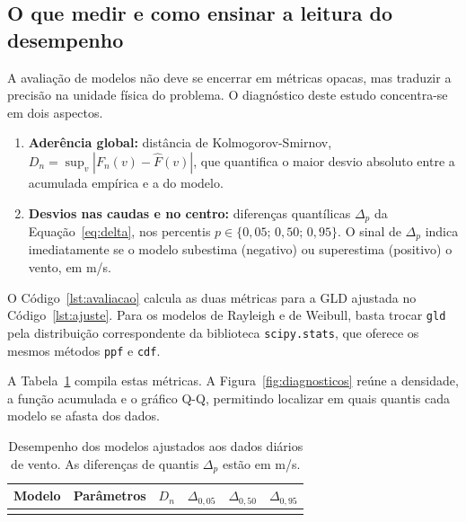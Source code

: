 \subsection{O que medir e como ensinar a leitura do desempenho}

A avaliação de modelos não deve se encerrar em métricas opacas, mas traduzir a precisão na unidade física do problema. O diagnóstico deste estudo concentra-se em dois aspectos.

\begin{enumerate}
    \item \textbf{Aderência global:} distância de Kolmogorov-Smirnov, $D_n = \sup_v |F_n(v) - \widehat{F}(v)|$, que quantifica o maior desvio absoluto entre a acumulada empírica e a do modelo.
    \item \textbf{Desvios nas caudas e no centro:} diferenças quantílicas $\Delta_p$ da Equação~\eqref{eq:delta}, nos percentis $p \in \{0,05;\, 0,50;\, 0,95\}$. O sinal de $\Delta_p$ indica imediatamente se o modelo subestima (negativo) ou superestima (positivo) o vento, em m/s.
\end{enumerate}

O Código~\ref{lst:avaliacao} calcula as duas métricas para a GLD ajustada no Código~\ref{lst:ajuste}. Para os modelos de Rayleigh e de Weibull, basta trocar \texttt{gld} pela distribuição correspondente da biblioteca \texttt{scipy.stats}, que oferece os mesmos métodos \texttt{ppf} e \texttt{cdf}.



A Tabela~\ref{tab:desempenho_vento} compila estas métricas. A Figura~\ref{fig:diagnosticos} reúne a densidade, a função acumulada e o gráfico Q-Q, permitindo localizar em quais quantis cada modelo se afasta dos dados.

\begin{table}[htbp]
\centering
\caption{Desempenho dos modelos ajustados aos dados diários de vento. As diferenças de quantis $\Delta_p$ estão em m/s.}
\label{tab:desempenho_vento}
\begin{tabular}{lccccc}
\toprule
\textbf{Modelo} & \textbf{Parâmetros} & \textbf{$D_n$} & \textbf{$\Delta_{0,05}$} & \textbf{$\Delta_{0,50}$} & \textbf{$\Delta_{0,95}$} \\
\midrule
\unskip \\
\bottomrule
\end{tabular}
\end{table}

